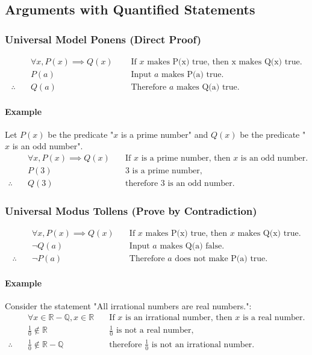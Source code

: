 \subsection{Arguments with Quantified Statements}
\hrulefill

\subsubsection*{Universal Model Ponens (Direct Proof)}
\begin{align*}
    &\forall x, P(x) \implies Q(x) \quad &\text{ If $x$ makes P(x) true, then x makes Q(x) true.}\\
    &P(a) \quad &\text{ Input $a$ makes P(a) true.}\\
    \therefore \quad &Q(a) \quad &\text{ Therefore $a$ makes Q(a) true.}
\end{align*}

\paragraph*{Example}
Let $P(x)$ be the predicate "$x$ is a prime number" and $Q(x)$ be the predicate "$x$ is an odd number".
\begin{align*}
    &\forall x, P(x) \implies Q(x) \quad &\text{If $x$ is a prime number, then $x$ is an odd number.}\\
    &P(3) \quad &\text{3 is a prime number,}\\
    \therefore \quad &Q(3) \quad &\text{therefore 3 is an odd number.}
\end{align*}

\subsubsection*{Universal Modus Tollens (Prove by Contradiction)}
\begin{align*}
    &\forall x, P(x) \implies Q(x) \quad &\text{If $x$ makes P(x) true, then $x$ makes Q(x) true.}\\
    &\neg Q(a) \quad &\text{Input $a$ makes Q(a) false.}\\
    \therefore \quad &\neg P(a) \quad &\text{Therefore $a$ does not make P(a) true.}
\end{align*}

\paragraph*{Example}
Consider the statement "All irrational numbers are real numbers.":
\begin{align*}
    &\forall x \in \mathbb{R} - \mathbb{Q}, x \in \mathbb{R} \quad &\text{If $x$ is an irrational number, then $x$ is a real number.}\\
    &\frac{1}{0} \notin \mathbb{R} \quad &\text{$\frac{1}{0}$ is not a real number,}\\
    \therefore \quad &\frac{1}{0} \notin \mathbb{R} - \mathbb{Q} \quad &\text{therefore $\frac{1}{0}$ is not an irrational number.}
\end{align*}

